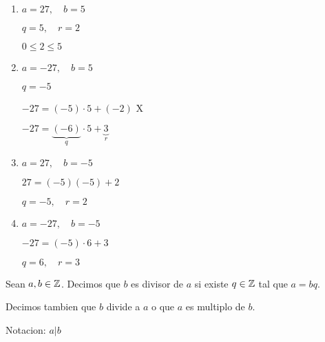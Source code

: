 \begin{example}
	~\begin{enumerate}
		\item \(a = 27, \quad b = 5 \)
		      
		      \(q = 5, \quad r = 2 \)
		      
		      \(0 \leq 2 \leq 5 \)
		\item \(a = -27, \quad b = 5 \)
		      
		      \(q = -5\)
		      
		      \(-27 = (-5) \cdot 5 + (-2) \) X
		      
		      \(-27 = \underbrace{(-6)}_{q} \cdot 5 + \underbrace{3}_{r} \)
		      
		\item \(a = 27, \quad b = -5 \)
		      
		      \(27 = (-5)(-5) + 2 \)
		      
		      \(q = -5, \quad r = 2 \)
		      
		\item \(a = -27, \quad b = -5\)
		      
		      \(-27 = (-5) \cdot 6 + 3 \)
		      
		      \(q = 6, \quad r = 3\)
	\end{enumerate}
\end{example}

\begin{definition}
	Sean \(a, b \in \mathbb{Z} \). Decimos que \(b \) es divisor de \(a \) si existe \(q \in \mathbb{Z} \) tal que \(a = bq \).
	
	Decimos tambien que \(b \) divide a \(a \) o que \(a \) es multiplo de \(b \).
	
	Notacion: \(a|b\)
\end{definition}


